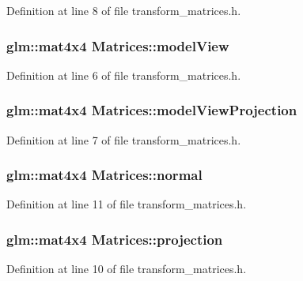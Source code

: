 Definition at line 8 of file transform\+\_\+matrices.\+h.

\hypertarget{struct_matrices_a55eeaf59b817be66d2149f5e131f8de3}{}
\subsubsection[{model\+View}]{\setlength{\rightskip}{0pt plus 5cm}glm\+::mat4x4 Matrices\+::model\+View}\label{struct_matrices_a55eeaf59b817be66d2149f5e131f8de3}


Definition at line 6 of file transform\+\_\+matrices.\+h.

\hypertarget{struct_matrices_a42af8cc09c21dbba6c3284291d2dba61}{}
\subsubsection[{model\+View\+Projection}]{\setlength{\rightskip}{0pt plus 5cm}glm\+::mat4x4 Matrices\+::model\+View\+Projection}\label{struct_matrices_a42af8cc09c21dbba6c3284291d2dba61}


Definition at line 7 of file transform\+\_\+matrices.\+h.

\hypertarget{struct_matrices_ae02f038cdeb0852e4235ab59d111337e}{}
\subsubsection[{normal}]{\setlength{\rightskip}{0pt plus 5cm}glm\+::mat4x4 Matrices\+::normal}\label{struct_matrices_ae02f038cdeb0852e4235ab59d111337e}


Definition at line 11 of file transform\+\_\+matrices.\+h.

\hypertarget{struct_matrices_a39c06d4402c7e41b394a74790934fc53}{}
\subsubsection[{projection}]{\setlength{\rightskip}{0pt plus 5cm}glm\+::mat4x4 Matrices\+::projection}\label{struct_matrices_a39c06d4402c7e41b394a74790934fc53}


Definition at line 10 of file transform\+\_\+matrices.\+h.

